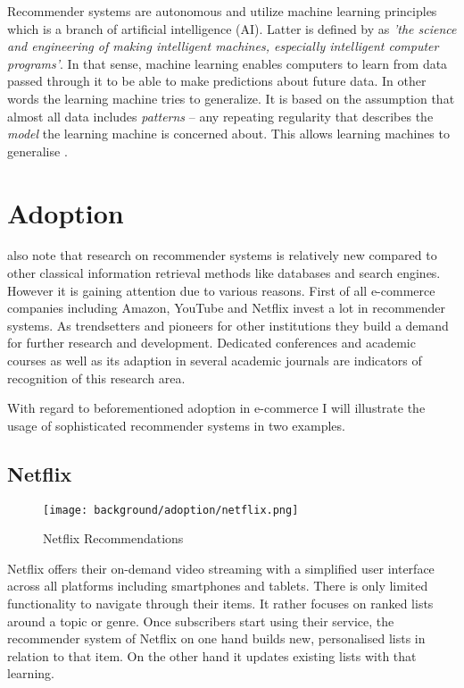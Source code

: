 Recommender systems are autonomous and utilize machine learning principles which is a branch of artificial intelligence (AI). Latter is defined by  as \textit{'the science and engineering of making intelligent machines, especially intelligent computer programs'}. In that sense, machine learning enables computers to learn from data passed through it to be able to make predictions about future data. In other words the learning machine tries to generalize. It is based on the assumption that almost all data includes \textit{patterns} -- any repeating regularity that describes the \textit{model} the learning machine is concerned about. This allows learning machines to generalise \cite{segaran07}.

\section{Adoption}

 also note that research on recommender systems is relatively new compared to other classical information retrieval methods like databases and search engines. However it is gaining attention due to various reasons. First of all e-commerce companies including Amazon, YouTube and Netflix invest a lot in recommender systems. As trendsetters and pioneers for other institutions they build a demand for further research and development. Dedicated conferences and academic courses as well as its adaption in several academic journals are indicators of recognition of this research area.

With regard to beforementioned adoption in e-commerce I will illustrate the usage of sophisticated recommender systems in two examples.

\subsection{Netflix}

\begin{figure}[ht]
    \texttt{[image: background/adoption/netflix.png]}
    \caption{Netflix Recommendations}
    \label{fig:netflix}
\end{figure}

Netflix offers their on-demand video streaming with a simplified user interface across all platforms including smartphones and tablets. There is only limited functionality to navigate through their items. It rather focuses on ranked lists around a topic or genre. Once subscribers start using their service, the recommender system of Netflix on one hand builds new, personalised lists in relation to that item. On the other hand it updates existing lists with that learning.

